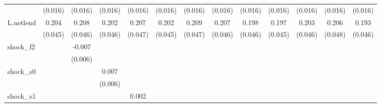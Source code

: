 {\begin{tabular}{l*{12}{c}}
            &     (0.016)         &     (0.016)         &     (0.016)         &     (0.016)         &     (0.016)         &     (0.016)         &     (0.016)         &     (0.016)         &     (0.016)         &     (0.016)         &     (0.016)         &     (0.016)         \\
\addlinespace
L.netlend   &       0.204\sym{***}&       0.208\sym{***}&       0.202\sym{***}&       0.207\sym{***}&       0.202\sym{***}&       0.209\sym{***}&       0.207\sym{***}&       0.198\sym{***}&       0.197\sym{***}&       0.203\sym{***}&       0.206\sym{***}&       0.193\sym{***}\\
            &     (0.045)         &     (0.046)         &     (0.046)         &     (0.047)         &     (0.045)         &     (0.047)         &     (0.046)         &     (0.046)         &     (0.045)         &     (0.046)         &     (0.048)         &     (0.046)         \\
\addlinespace
shock\_f2    &                     &      -0.007         &                     &                     &                     &                     &                     &                     &                     &                     &                     &                     \\
            &                     &     (0.006)         &                     &                     &                     &                     &                     &                     &                     &                     &                     &                     \\
\addlinespace
shock\_s0    &                     &                     &       0.007         &                     &                     &                     &                     &                     &                     &                     &                     &                     \\
            &                     &                     &     (0.006)         &                     &                     &                     &                     &                     &                     &                     &                     &                     \\
\addlinespace
shock\_s1    &                     &                     &                     &       0.002         &                     &                     &                     &                     &                     &                     &                     &                     \\

\end{tabular}}
